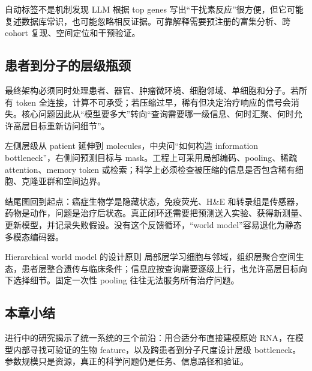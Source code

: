 \begin{warningbox}{自动标签不是机制发现}
LLM 根据 top genes 写出“干扰素反应”很方便，但它可能复述数据库常识，也可能忽略相反证据。可靠解释需要预注册的富集分析、跨 cohort 复现、空间定位和干预验证。
\end{warningbox}

\subsection{患者到分子的层级瓶颈}

最终架构必须同时处理患者、器官、肿瘤微环境、细胞邻域、单细胞和分子。若所有 token 全连接，计算不可承受；若压缩过早，稀有但决定治疗响应的信号会消失。核心问题因此从“模型要多大”转向“查询需要哪一级信息、何时汇聚、何时允许高层目标重新访问细节”。


左侧层级从 patient 延伸到 molecules，中央问“如何构造 information bottleneck”，右侧问预测目标与 mask。工程上可采用局部编码、pooling、稀疏 attention、memory token 或检索；科学上必须检查被压缩的信息是否包含稀有细胞、克隆亚群和空间边界。


结尾图回到起点：癌症生物学是隐藏状态，免疫荧光、H\&E 和转录组是传感器，药物是动作，问题是治疗后状态。真正闭环还需要把预测送入实验、获得新测量、更新模型，并记录失败假设。没有这个反馈循环，“world model”容易退化为静态多模态编码器。


\begin{importantbox}{Hierarchical world model 的设计原则}
局部层学习细胞与邻域，组织层聚合空间生态，患者层整合遗传与临床条件；信息应按查询需要逐级上行，也允许高层目标向下选择细节。固定一次性 pooling 往往无法服务所有治疗问题。
\end{importantbox}

\subsection{本章小结}

进行中的研究揭示了统一系统的三个前沿：用合适分布直接建模原始 RNA，在模型内部寻找可验证的生物 feature，以及跨患者到分子尺度设计层级 bottleneck。参数规模只是资源，真正的科学问题仍是任务、信息路径和验证。

